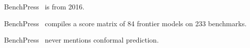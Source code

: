 BenchPress~\cite{zeng2026benchpress} is from 2016.

BenchPress~\cite{zeng2026benchpress} compiles a score matrix of 84 frontier models on 233 benchmarks.

BenchPress~\cite{zeng2026benchpress} never mentions conformal prediction.
